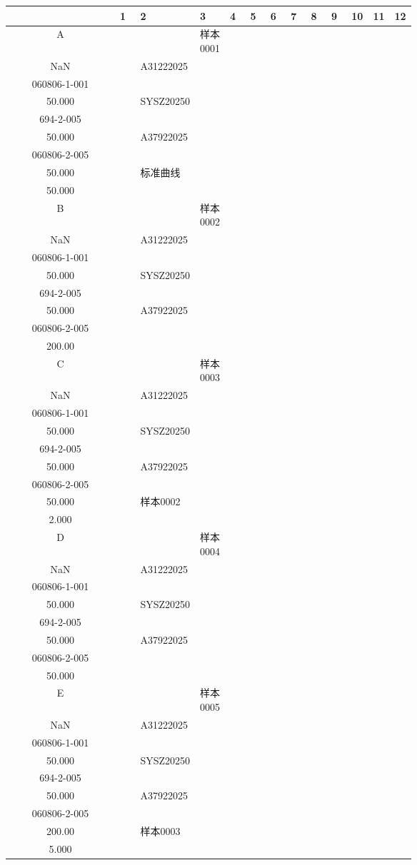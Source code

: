 \documentclass[UTF8,10pt,a4paper,fontset=fandol]{ctexart}
\begin{document}
\begin{center}
\scriptsize
\begin{tabular}{c|*{12}{p{0.055\linewidth}|}}
 &1&2&3&4&5&6&7&8&9&10&11&12\\ \hline
A&&&样本0001\\NaN&&
A31222025\\060806-1-001\\50.000&&
SYSZ20250\\694-2-005\\50.000&&
A37922025\\060806-2-005\\50.000&&
标准曲线\\50.000&&\\ \hline
B&&&样本0002\\NaN&&
A31222025\\060806-1-001\\50.000&&
SYSZ20250\\694-2-005\\50.000&&
A37922025\\060806-2-005\\200.00&&&&\\ \hline
C&&&样本0003\\NaN&&
A31222025\\060806-1-001\\50.000&&
SYSZ20250\\694-2-005\\50.000&&
A37922025\\060806-2-005\\50.000&&
样本0002\\2.000&&\\ \hline
D&&&样本0004\\NaN&&
A31222025\\060806-1-001\\50.000&&
SYSZ20250\\694-2-005\\50.000&&
A37922025\\060806-2-005\\50.000&&&&\\ \hline
E&&&样本0005\\NaN&&
A31222025\\060806-1-001\\50.000&&
SYSZ20250\\694-2-005\\50.000&&
A37922025\\060806-2-005\\200.00&&
样本0003\\5.000&&\\ \hline

\end{tabular}
\end{center}
\end{document}
